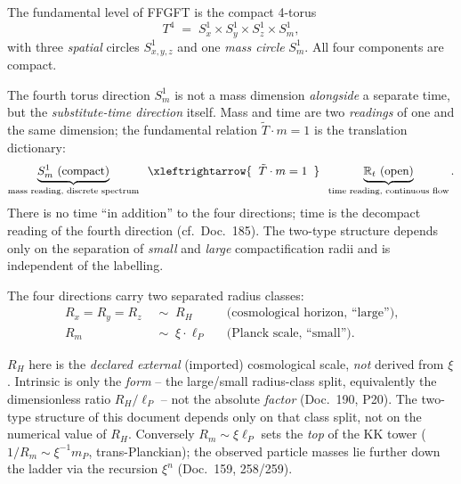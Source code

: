 \begin{definition}\label{def:t4}
The fundamental level of FFGFT is the compact 4-torus
\[
  T^4 \;=\; S^1_x \times S^1_y \times S^1_z \times S^1_m ,
\]
with three \emph{spatial} circles $S^1_{x,y,z}$ and one \emph{mass circle}
$S^1_m$. All four components are compact.
\end{definition}

\begin{remark}\label{bem:struktur}
The fourth torus direction $S^1_m$ is not a mass dimension \emph{alongside} a
separate time, but the \emph{substitute-time direction} itself. Mass and time
are two \emph{readings} of one and the same dimension; the fundamental relation
$\tilde{T}\cdot m = 1$ is the translation dictionary:
\[
  \underbrace{S^1_m \text{ (compact)}}_{\text{mass reading, discrete spectrum}}
  \;\;\xleftrightarrow{\;\;\tilde{T}\cdot m = 1\;\;}\;\;
  \underbrace{\mathbb{R}_t \text{ (open)}}_{\text{time reading, continuous flow}}.
\]
There is no time ``in addition'' to the four directions; time is the
decompact reading of the fourth direction (cf.\ Doc.~185). The two-type
structure depends only on the separation of \emph{small} and \emph{large}
compactification radii and is independent of the labelling.
\end{remark}

The four directions carry two separated radius classes:
\begin{align}
  R_x = R_y = R_z &\;\sim\; R_H
  && \text{(cosmological horizon, ``large'')},\\
  R_m &\;\sim\; \xi \cdot \ell_P
  && \text{(Planck scale, ``small'')}.
\end{align}

\begin{remark}\label{bem:skalen}
$R_H$ here is the \emph{declared external} (imported) cosmological scale,
\emph{not} derived from $\xi$. Intrinsic is only the \emph{form} -- the
large/small radius-class split, equivalently the dimensionless ratio
$R_H/\ell_P$ -- not the absolute \emph{factor} (Doc.~190, P20). The two-type
structure of this document depends only on that class split, not on the
numerical value of $R_H$. Conversely $R_m\sim\xi\ell_P$ sets the \emph{top} of the
KK tower ($1/R_m\sim\xi^{-1}m_P$, trans-Planckian); the observed particle masses
lie further down the ladder via the recursion $\xi^n$ (Doc.~159, 258/259).
\end{remark}

